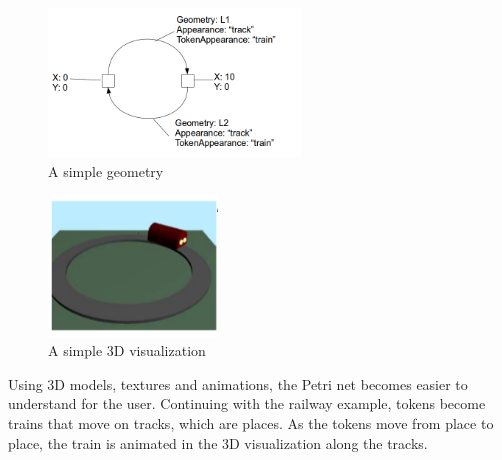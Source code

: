 \begin{figure}[htp]
	\begin{center}
		\includegraphics[width=0.6\textwidth]{image/example_petrinet_geometry.png}
		\caption{A simple geometry}
		\label{fig:example_petrinet_geometry}
	\end{center}
\end{figure}


\begin{figure}[htp]
\begin{center}
  \includegraphics[width=0.4\textwidth]{image/3d.png}
  \caption{A simple 3D visualization}
  \label{fig:example_3d}
\end{center}
\end{figure}

%

Using 3D models, textures and animations, the Petri net becomes easier to understand for the user. Continuing with the railway example, tokens become trains that move on tracks, which are places. As the tokens move from place to place, the train is animated in the 3D visualization along the tracks.

